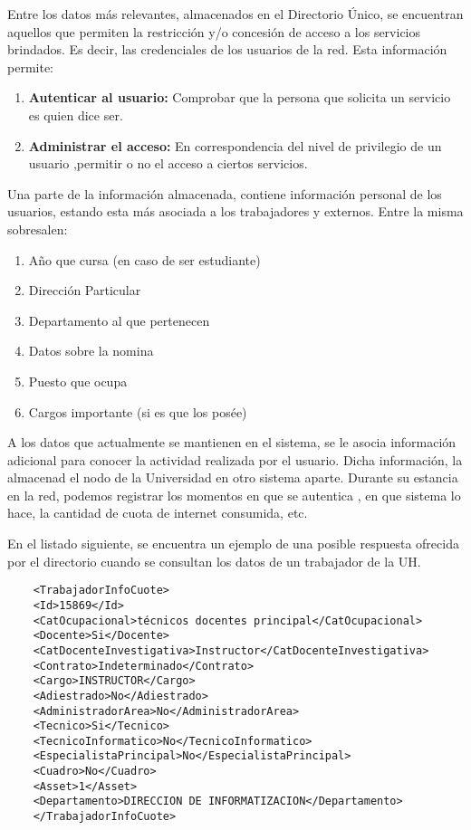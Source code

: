 Entre los datos más relevantes, almacenados en el Directorio Único, se encuentran aquellos 
que permiten la restricción y/o concesión de acceso a los servicios brindados. Es decir, 
las credenciales de los usuarios de la red. Esta información permite:

\begin{enumerate}
\item {\bf Autenticar al usuario:} Comprobar que la persona que solicita un servicio es 
quien dice ser.
\item {\bf Administrar el acceso:} En correspondencia del nivel de privilegio de un usuario 
,permitir o no el acceso a ciertos servicios.
\end{enumerate}

Una parte de la información almacenada, contiene información personal de los usuarios,
estando esta más asociada a los trabajadores y externos. Entre la 
misma sobresalen: 
\begin{enumerate}
	\item Año que cursa (en caso de ser estudiante)
	\item Direcci\'on Particular
	\item Departamento al que pertenecen
	\item Datos sobre la nomina
	\item Puesto que ocupa
	\item Cargos importante (si es que los pos\'ee)
\end{enumerate}

A los datos que actualmente se mantienen en el sistema, se le asocia información adicional
para conocer la actividad realizada por el usuario. Dicha información, la almacenad el nodo
de la Universidad en otro sistema aparte. Durante su estancia en la red, podemos registrar
los momentos en que se autentica , en que sistema lo hace, la cantidad de cuota de internet
consumida, etc.

En el listado siguiente, se encuentra un ejemplo de una posible respuesta ofrecida por el 
directorio cuando se consultan los datos de un trabajador de la UH.

\begin{verbatim}
	<TrabajadorInfoCuote>
	<Id>15869</Id>
	<CatOcupacional>técnicos docentes principal</CatOcupacional>
	<Docente>Si</Docente>
	<CatDocenteInvestigativa>Instructor</CatDocenteInvestigativa>
	<Contrato>Indeterminado</Contrato>
	<Cargo>INSTRUCTOR</Cargo>
	<Adiestrado>No</Adiestrado>
	<AdministradorArea>No</AdministradorArea>
	<Tecnico>Si</Tecnico>
	<TecnicoInformatico>No</TecnicoInformatico>
	<EspecialistaPrincipal>No</EspecialistaPrincipal>
	<Cuadro>No</Cuadro>
	<Asset>1</Asset>
	<Departamento>DIRECCION DE INFORMATIZACION</Departamento>
	</TrabajadorInfoCuote>
\end{verbatim}

